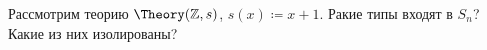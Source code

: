 Рассмотрим теорию $\Theory(\mathbb{Z}, s)$, $s(x) \coloneqq x + 1$. Ракие типы входят в $S_n$? Какие из
них изолированы?
